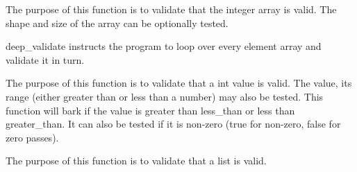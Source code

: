 \documentclass[letterpaper,10pt,english]{sphinxmanual}
\begin{document}

\begin{fulllineitems}
\label{\detokenize{Robustness.validation:Robustness.validation.validate_int_array}}
The purpose of this function is to validate that the integer array is
valid. The shape and size of the array can be optionally tested.

deep\_validate instructs the program to loop over every element array and
validate it in turn.

\end{fulllineitems}


\begin{fulllineitems}
\label{\detokenize{Robustness.validation:Robustness.validation.validate_int_value}}
The purpose of this function is to validate that a int value is valid.
The value, its range (either greater than or less than a number) may
also be tested. This function will bark if the value is greater than
less\_than or less than greater\_than. It can also be tested if it is
non-zero (true for non-zero, false for zero passes).

\end{fulllineitems}


\begin{fulllineitems}
\label{\detokenize{Robustness.validation:Robustness.validation.validate_list}}
The purpose of this function is to validate that a list is valid.

\end{fulllineitems}

\end{document}
